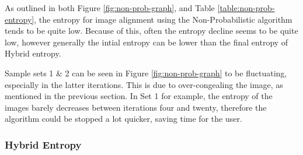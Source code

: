 As outlined in both Figure \ref{fig:non-prob-graph}, and Table \ref{table:non-prob-entropy}, the entropy for image alignment using the Non-Probabilistic algorithm tends to be quite low. Because of this, often the entropy decline seems to be quite low, however generally the intial entropy can be lower than the final entropy of Hybrid entropy.

Sample sets 1 \& 2 can be seen in Figure \ref{fig:non-prob-graph} to be fluctuating, especially in the latter iterations. This is due to over-congealing the image, as mentioned in the previous section. In Set 1 for example, the entropy of the images barely decreases between iterations four and twenty, therefore the algorithm could be stopped a lot quicker, saving time for the user.

\newpage
\subsubsection{Hybrid Entropy}
\label{sssec:hybrid-alignment}

